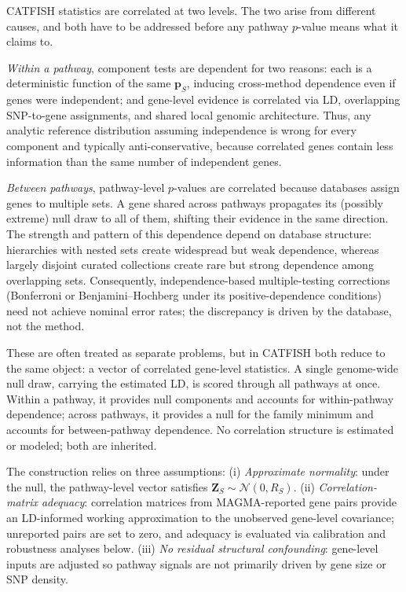 CATFISH statistics are correlated at two levels. The two arise from different
causes, and both have to be addressed before any pathway $p$-value means what
it claims to.

\emph{Within a pathway}, component tests are dependent for two reasons: each is a deterministic function of the same $\mathbf{p}_S$, inducing cross-method dependence even if genes were independent; and gene-level evidence is correlated via LD, overlapping SNP-to-gene assignments, and shared local genomic architecture. Thus, any analytic reference distribution assuming independence is wrong for every component and typically anti-conservative, because correlated genes contain less information than the same number of independent genes.

\emph{Between pathways}, pathway-level $p$-values are correlated because databases assign genes to multiple sets. A gene shared across pathways propagates its (possibly extreme) null draw to all of them, shifting their evidence in the same direction. The strength and pattern of this dependence depend on database structure: hierarchies with nested sets create widespread but weak dependence, whereas largely disjoint curated collections create rare but strong dependence among overlapping sets. Consequently, independence-based multiple-testing corrections (Bonferroni or Benjamini--Hochberg under its positive-dependence conditions) need not achieve nominal error rates; the discrepancy is driven by the database, not the method.

These are often treated as separate problems, but in CATFISH both reduce to the same object: a vector of correlated gene-level statistics. A single genome-wide null draw, carrying the estimated LD, is scored through all pathways at once. Within a pathway, it provides null components and accounts for within-pathway dependence; across pathways, it provides a null for the family minimum and accounts for between-pathway dependence. No correlation structure is estimated or modeled; both are inherited.

The construction relies on three assumptions: (i) \emph{Approximate normality}: under the null, the pathway-level vector satisfies $\mathbf{Z}_S\sim\mathcal{N}(0,R_S)$. (ii) \emph{Correlation-matrix adequacy}: correlation matrices from MAGMA-reported gene pairs provide an LD-informed working approximation to the unobserved gene-level covariance; unreported pairs are set to zero, and adequacy is evaluated via calibration and robustness analyses below. (iii) \emph{No residual structural confounding}: gene-level inputs are adjusted so pathway signals are not primarily driven by gene size or SNP density.

